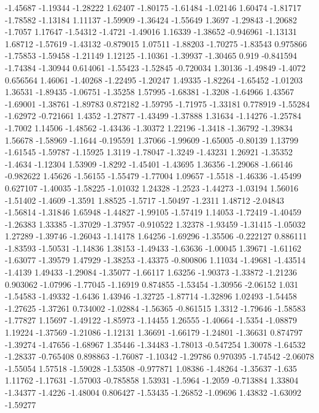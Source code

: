 \documentclass[9pt]{article}
\theoremstyle{plain}
\theoremstyle{definition}
\theoremstyle{remark}
\numberwithin{equation}{section}
\begin{document}
-1.45687
-1.19344
-1.28222
1.62407
-1.80175
-1.61484
-1.02146
1.60474
-1.81717
-1.78582
-1.13184
1.11137
-1.59909
-1.36424
-1.55649
1.3697
-1.29843
-1.20682
-1.7057
1.17647
-1.54312
-1.4721
-1.49016
1.16339
-1.38652
-0.946961
-1.13131
1.68712
-1.57619
-1.43132
-0.879015
1.07511
-1.88203
-1.70275
-1.83543
0.975866
-1.75853
-1.59458
-1.21149
1.12125
-1.10361
-1.39937
-1.30465
0.919
-0.841594
-1.74384
-1.30944
0.614061
-1.55423
-1.52845
-0.720034
1.30136
-1.49849
-1.4072
0.656564
1.46061
-1.40268
-1.22495
-1.20247
1.49335
-1.82264
-1.65452
-1.01203
1.36531
-1.89435
-1.06751
-1.35258
1.57995
-1.68381
-1.3208
-1.64966
1.43567
-1.69001
-1.38761
-1.89783
0.872182
-1.59795
-1.71975
-1.33181
0.778919
-1.55284
-1.62972
-0.721661
1.4352
-1.27877
-1.43499
-1.37888
1.31634
-1.14276
-1.25784
-1.7002
1.14506
-1.48562
-1.43436
-1.30372
1.22196
-1.3418
-1.36792
-1.39834
1.56678
-1.58969
-1.1644
-0.195591
1.37066
-1.99609
-1.65005
-0.80139
1.13799
-1.61545
-1.59787
-1.15925
1.3119
-1.78047
-1.3249
-1.43231
1.26921
-1.35352
-1.4634
-1.12304
1.53909
-1.8292
-1.45401
-1.43695
1.36356
-1.29068
-1.66146
-0.982622
1.45626
-1.56155
-1.55479
-1.77004
1.09657
-1.5518
-1.46336
-1.45499
0.627107
-1.40035
-1.58225
-1.01032
1.24328
-1.2523
-1.44273
-1.03194
1.56016
-1.51402
-1.4609
-1.3591
1.88525
-1.5717
-1.50497
-1.2311
1.48712
-2.04843
-1.56814
-1.31846
1.65948
-1.44827
-1.99105
-1.57419
1.14053
-1.72419
-1.40459
-1.26383
1.33385
-1.37029
-1.37957
-0.910522
1.32378
-1.93459
-1.31415
-1.05032
1.27289
-1.39746
-1.26043
-1.14178
1.64256
-1.69296
-1.35506
-0.222127
0.886111
-1.83593
-1.50531
-1.14836
1.38153
-1.49433
-1.63636
-1.00045
1.39671
-1.61162
-1.63077
-1.39579
1.47929
-1.38253
-1.43375
-0.800806
1.11034
-1.49681
-1.43514
-1.4139
1.49433
-1.29084
-1.35077
-1.66117
1.63256
-1.90373
-1.33872
-1.21236
0.903062
-1.07996
-1.77045
-1.16919
0.874855
-1.53454
-1.30956
-2.06152
1.031
-1.54583
-1.49332
-1.6436
1.43946
-1.32725
-1.87714
-1.32896
1.02493
-1.54458
-1.27625
-1.37261
0.734002
-1.02884
-1.56365
-0.861515
1.3312
-1.79646
-1.58583
-1.77827
1.15697
-1.49122
-1.85973
-1.14455
1.26555
-1.40664
-1.5354
-1.08879
1.19224
-1.37569
-1.21086
-1.12131
1.36691
-1.66179
-1.24801
-1.36631
0.874797
-1.39274
-1.47656
-1.68967
1.35446
-1.34483
-1.78013
-0.547254
1.30078
-1.64532
-1.28337
-0.765408
0.898863
-1.76087
-1.10342
-1.29786
0.970395
-1.74542
-2.06078
-1.55054
1.57518
-1.59028
-1.53508
-0.977871
1.08386
-1.48264
-1.35637
-1.635
1.11762
-1.17631
-1.57003
-0.785858
1.53931
-1.5964
-1.2059
-0.713884
1.33804
-1.34377
-1.4226
-1.48004
0.806427
-1.53435
-1.26852
-1.09696
1.43832
-1.63092
-1.59277
\end{document}
